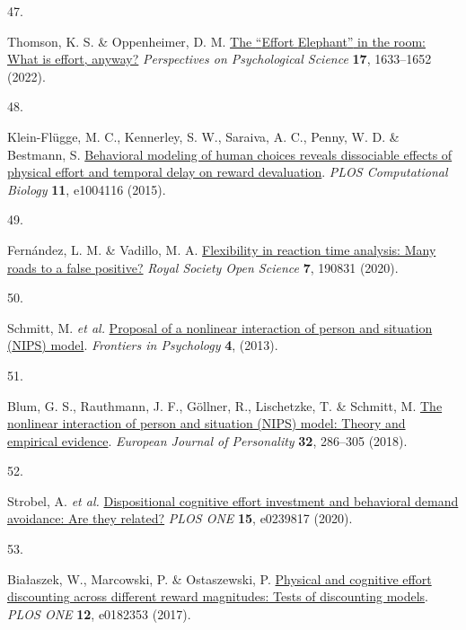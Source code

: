 \documentclass[
  man,floatsintext]{apa6}
\newlength{\cslhangindent}
\newlength{\csllabelwidth}
\newlength{\cslentryspacingunit} %
\newenvironment{CSLReferences}[2] %
 {%
  \setlength{\parindent}{0pt}
  \ifodd #1
  \let\oldpar\par
  \def\par{\hangindent=\cslhangindent\oldpar}
  \fi
  \setlength{\parskip}{#2\cslentryspacingunit}
 }%
 {}
\newcommand{\CSLLeftMargin}[1]{\parbox[t]{\csllabelwidth}{#1}}
\newcommand{\CSLRightInline}[1]{\parbox[t]{\linewidth - \csllabelwidth}{#1}\break}
\begin{document}
\begin{CSLReferences}{0}{0}
\leavevmode{}%
\CSLLeftMargin{47. }%
\CSLRightInline{Thomson, K. S. \& Oppenheimer, D. M. \href{https://doi.org/10.1177/17456916211064896}{The {``}{E}ffort {E}lephant{''} in the room: {W}hat is effort, anyway?} \emph{Perspectives on Psychological Science} \textbf{17}, 1633--1652 (2022).}

\leavevmode{}%
\CSLLeftMargin{48. }%
\CSLRightInline{Klein-Flügge, M. C., Kennerley, S. W., Saraiva, A. C., Penny, W. D. \& Bestmann, S. \href{https://doi.org/10.1371/journal.pcbi.1004116}{Behavioral modeling of human choices reveals dissociable effects of physical effort and temporal delay on reward devaluation}. \emph{{PLOS} Computational Biology} \textbf{11}, e1004116 (2015).}

\leavevmode{}%
\CSLLeftMargin{49. }%
\CSLRightInline{Fernández, L. M. \& Vadillo, M. A. \href{https://doi.org/10.1098/rsos.190831}{Flexibility in reaction time analysis: Many roads to a false positive?} \emph{Royal Society Open Science} \textbf{7}, 190831 (2020).}

\leavevmode{}%
\CSLLeftMargin{50. }%
\CSLRightInline{Schmitt, M. \emph{et al.} \href{https://doi.org/10.3389/fpsyg.2013.00499}{Proposal of a nonlinear interaction of person and situation ({NIPS}) model}. \emph{Frontiers in Psychology} \textbf{4}, (2013).}

\leavevmode{}%
\CSLLeftMargin{51. }%
\CSLRightInline{Blum, G. S., Rauthmann, J. F., Göllner, R., Lischetzke, T. \& Schmitt, M. \href{https://doi.org/10.1002/per.2138}{The nonlinear interaction of person and situation ({NIPS)} model: {Theory} and empirical evidence}. \emph{European Journal of Personality} \textbf{32}, 286--305 (2018).}

\leavevmode{}%
\CSLLeftMargin{52. }%
\CSLRightInline{Strobel, A. \emph{et al.} \href{https://doi.org/10.1371/journal.pone.0239817}{Dispositional cognitive effort investment and behavioral demand avoidance: {Are} they related?} \emph{PLOS ONE} \textbf{15}, e0239817 (2020).}

\leavevmode{}%
\CSLLeftMargin{53. }%
\CSLRightInline{Białaszek, W., Marcowski, P. \& Ostaszewski, P. \href{https://doi.org/10.1371/journal.pone.0182353}{Physical and cognitive effort discounting across different reward magnitudes: Tests of discounting models}. \emph{{PLOS} {ONE}} \textbf{12}, e0182353 (2017).}

\end{CSLReferences}
\end{document}
